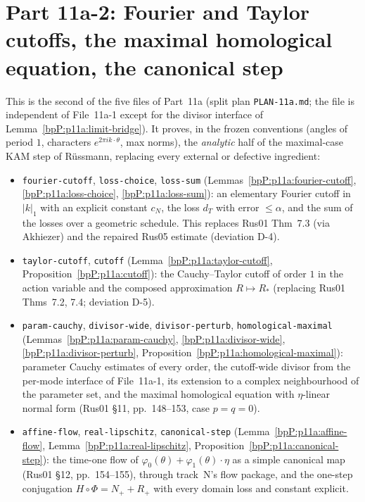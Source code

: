 \section{Part 11a-2: Fourier and Taylor cutoffs, the maximal homological equation, the canonical step}\label{bpP:p11a2}
\begingroup\sloppy

\newcommand{\Dd}[3]{\mathcal D(#1,#2;#3)}
\newcommand{\nrm}[2]{\lVert #1\rVert_{#2}}
\newcommand{\cN}{c_N}
\newcommand{\EN}{\varepsilon_N}
\newcommand{\Lam}[1]{\Lambda_{#1}}
\newcommand{\Tr}{\mathsf T}
\newcommand{\cut}{\mathcal T}

This is the second of the five files of Part~11a (split plan \texttt{PLAN-11a.md}; the file is independent of File~11a-1 except for the divisor interface of Lemma~\ref{bpP:p11a:limit-bridge}). It proves, in the frozen conventions (angles of period $1$, characters $e^{2\pi ik\cdot\theta}$, max norms), the \emph{analytic} half of the maximal-case KAM step of R\"ussmann, replacing every external or defective ingredient:
\begin{itemize}
\item \texttt{fourier-cutoff}, \texttt{loss-choice}, \texttt{loss-sum} (Lemmas~\ref{bpP:p11a:fourier-cutoff}, \ref{bpP:p11a:loss-choice}, \ref{bpP:p11a:loss-sum}): an elementary Fourier cutoff in $\lvert k\rvert_1$ with an explicit constant $c_N$, the loss $d_T$ with error $\le\alpha$, and the sum of the losses over a geometric schedule. This replaces Rus01 Thm~7.3 (via Akhiezer) and the repaired Rus05 estimate (deviation D-4).
\item \texttt{taylor-cutoff}, \texttt{cutoff} (Lemma~\ref{bpP:p11a:taylor-cutoff}, Proposition~\ref{bpP:p11a:cutoff}): the Cauchy--Taylor cutoff of order $1$ in the action variable and the composed approximation $R\mapsto R_*$ (replacing Rus01 Thms~7.2, 7.4; deviation D-5).
\item \texttt{param-cauchy}, \texttt{divisor-wide}, \texttt{divisor-perturb}, \texttt{homological-maximal} (Lemmas~\ref{bpP:p11a:param-cauchy}, \ref{bpP:p11a:divisor-wide}, \ref{bpP:p11a:divisor-perturb}, Proposition~\ref{bpP:p11a:homological-maximal}): parameter Cauchy estimates of every order, the cutoff-wide divisor from the per-mode interface of File~11a-1, its extension to a complex neighbourhood of the parameter set, and the maximal homological equation with $\eta$-linear normal form (Rus01 \S11, pp.~148--153, case $p=q=0$).
\item \texttt{affine-flow}, \texttt{real-lipschitz}, \texttt{canonical-step} (Lemma~\ref{bpP:p11a:affine-flow}, Lemma~\ref{bpP:p11a:real-lipschitz}, Proposition~\ref{bpP:p11a:canonical-step}): the time-one flow of $\varphi_0(\theta)+\varphi_1(\theta)\cdot\eta$ as a simple canonical map (Rus01 \S12, pp.~154--155), through track~N's flow package, and the one-step conjugation $H\circ\Phi=N_++R_+$ with every domain loss and constant explicit.
\end{itemize}

